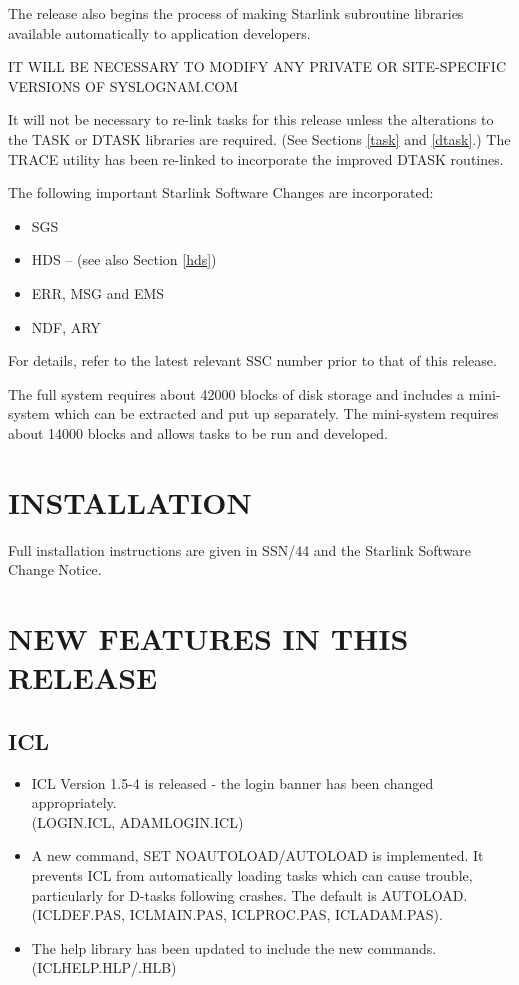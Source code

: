 The release also begins the process of making Starlink subroutine
libraries available automatically to application developers.

IT WILL BE NECESSARY TO MODIFY ANY PRIVATE OR SITE-SPECIFIC VERSIONS OF
SYSLOGNAM.COM

It will not be necessary to re-link tasks for this release unless the 
alterations to the TASK or DTASK libraries are required.
(See Sections \ref{task} and \ref{dtask}.)
The TRACE utility has been re-linked to incorporate the improved DTASK
routines.

The following important Starlink Software Changes are incorporated:
\begin{itemize}
\item SGS
\item HDS -- (see also Section \ref{hds})
\item ERR, MSG and EMS
\item NDF, ARY
\end{itemize}
For details, refer to the latest relevant SSC number prior to that of this 
release.

The full system requires about 42000 blocks of disk storage and includes a
mini-system which can be extracted and put up separately. The mini-system
requires about 14000 blocks and allows tasks to be run and  developed.

\section{INSTALLATION}
Full installation instructions are given in SSN/44 and the Starlink Software 
Change Notice.

\section{NEW FEATURES IN THIS RELEASE}

\subsection{ICL}
\begin{itemize}
\item ICL Version 1.5-4 is released - the login banner has been changed
appropriately.\\ (LOGIN.ICL, ADAMLOGIN.ICL)
\item A new command, SET NOAUTOLOAD/AUTOLOAD is implemented. It prevents ICL
from automatically loading tasks which can cause trouble, particularly for
D-tasks following crashes.
The default is AUTOLOAD.\\
(ICLDEF.PAS, ICLMAIN.PAS, ICLPROC.PAS, ICLADAM.PAS).
\item The help library has been updated to include the new commands.\\
(ICLHELP.HLP/.HLB)
\end{itemize}


